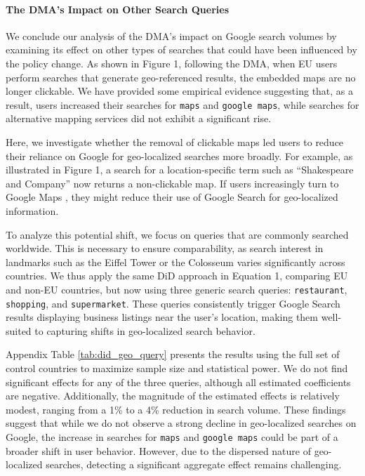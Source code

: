 \documentclass[11pt]{article}
\begin{document}
	
	
	\clearpage
	
	
	
	
	\paragraph{The DMA's Impact on Other Search Queries}
	
	We conclude our analysis of the DMA’s impact on Google search volumes by examining its effect on other types of searches that could have been influenced by the policy change. As shown in Figure 1, following the DMA, when EU users perform searches that generate geo-referenced results, the embedded maps are no longer clickable. We have provided some empirical evidence suggesting that, as a result, users increased their searches for \texttt{maps} and \texttt{google maps}, while searches for alternative mapping services did not exhibit a significant rise.
	
	Here, we investigate whether the removal of clickable maps led users to reduce their reliance on Google for geo-localized searches more broadly. For example, as illustrated in Figure 1, a search for a location-specific term such as ``Shakespeare and Company'' now returns a non-clickable map. If users increasingly turn to Google Maps , they might reduce their use of Google Search for geo-localized information.
	
	To analyze this potential shift, we focus on queries that are commonly searched worldwide. This is necessary to ensure comparability, as search interest in landmarks such as the Eiffel Tower or the Colosseum varies significantly across countries. We thus apply the same DiD approach in Equation 1, comparing EU and non-EU countries, but now using three generic search queries: \texttt{restaurant}, \texttt{shopping}, and \texttt{supermarket}. These queries consistently trigger Google Search results displaying business listings near the user’s location, making them well-suited to capturing shifts in geo-localized search behavior.
	
	Appendix Table \ref{tab:did_geo_query} presents the results using the full set of control countries to maximize sample size and statistical power. We do not find significant effects for any of the three queries, although all estimated coefficients are negative. Additionally, the magnitude of the estimated effects is relatively modest, ranging from a 1\% to a 4\% reduction in search volume. These findings suggest that while we do not observe a strong decline in geo-localized searches on Google, the increase in searches for \texttt{maps} and \texttt{google maps} could be part of a broader shift in user behavior. However, due to the dispersed nature of geo-localized searches, detecting a significant aggregate effect remains challenging.
	
\end{document}
